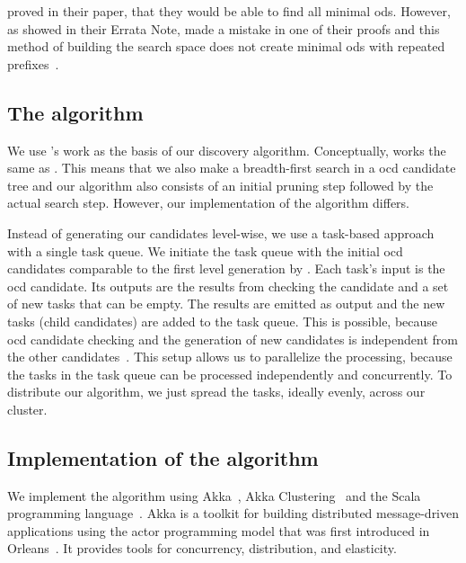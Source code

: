    proved in their paper, that they would be able to find all minimal \glspl{od}.
  However, as \citeauthor{szlichta:errata} showed in their Errata Note, \citeauthor{consonni} made a mistake in one of their proofs and this method of building the search space does not create minimal \glspl{od} with repeated prefixes~\cite{szlichta:errata}.

\subsection{The \dodo{} algorithm}\label{sec:dodo}

  We use \citeauthor{consonni}'s work as the basis of our discovery algorithm.
  Conceptually, \dodo{} works the same as \ocddiscover{}.
  This means that we also make a breadth-first search in a \gls{ocd} candidate tree and our algorithm also consists of an initial pruning step followed by the actual search step.
  However, our implementation of the algorithm differs.

  Instead of generating our candidates level-wise, we use a task-based approach with a single task queue.
  We initiate the task queue with the initial \gls{ocd} candidates comparable to the first level generation by \citeauthor{consonni}.
  Each task's input is the \gls{ocd} candidate.
  Its outputs are the results from checking the candidate and a set of new tasks that can be empty.
  The results are emitted as output and the new tasks (child candidates) are added to the task queue.
  This is possible, because \gls{ocd} candidate checking and the generation of new candidates is independent from the other candidates~\cite{consonni}.
  This setup allows us to parallelize the processing, because the tasks in the task queue can be processed independently and concurrently.
  To distribute our algorithm, we just spread the tasks, ideally evenly, across our cluster.

\subsection{Implementation of the \dodo{} algorithm}\label{sec:architecture}

  We implement the \dodo{} algorithm using Akka~\cite{akka}, Akka Clustering~\cite{akka:clustering} and the Scala programming language~\cite{scala}.
  Akka is a toolkit for building distributed message-driven applications using the actor programming model that was first introduced in Orleans~\cite{bernstein:orleans}.
  It provides tools for concurrency, distribution, and elasticity.

